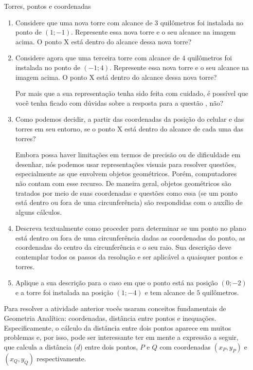 \clearpage

\begin{task}{Torres, pontos e coordenadas}
\begin{enumerate}
\item Considere que uma nova torre com alcance de $3$ quilômetros foi instalada no ponto de $(1;-1)$. Represente essa nova torre e o seu alcance na imagem acima. O ponto X está dentro do alcance dessa nova torre?

\item Considere agora que uma terceira torre com alcance de $4$ quilômetros foi instalada no ponto de $(-1;4)$. Represente essa nova torre e o seu alcance na imagem acima. O ponto X está dentro do alcance dessa nova torre?

Por mais que a sua representação tenha sido feita com cuidado, é possível que você tenha ficado com dúvidas sobre a resposta para a questão , não?

\item Como podemos decidir, a partir das coordenadas da posição do celular e das torres em seu entorno, se o ponto X está dentro do alcance de cada uma das torres?

Embora possa haver limitações em termos de precisão ou de dificuldade em desenhar, nós podemos usar representações visuais para resolver questões, especialmente as que envolvem objetos geométricos. Porém, computadores não contam com esse recurso. De maneira geral, objetos geométricos são tratados por meio de suas coordenadas e questões como essa (se um ponto está dentro ou fora de uma circunferência) são respondidas com o auxílio de alguns cálculos.

\item Descreva textualmente como proceder para determinar se um ponto no plano está dentro ou fora de uma circunferência dadas as coordenadas do ponto, as coordenadas do centro da circunferência e o seu raio. Sua descrição deve contemplar todos os passos da resolução e ser aplicável a quaisquer pontos e torres.

\item Aplique a sua descrição para o caso em que o ponto está na posição $(0;-2)$ e a torre foi instalada na posição $(1;-4)$ e tem alcance de $5$ quilômetros.
\end{enumerate}
\end{task}

\label{comp-arr10}

Para resolver a atividade anterior vocês usaram conceitos fundamentais de Geometria Analítica: coordenadas, distância entre pontos e inequações. Especificamente, o cálculo da distância entre dois pontos aparece em muitos problemas e, por isso, pode ser interessante ter em mente a expressão a seguir, que calcula a distância ($d$) entre dois pontos, $P$ e $Q$ com coordenadas $(x_P,y_P)$ e $(x_Q,y_Q)$ respectivamente.

